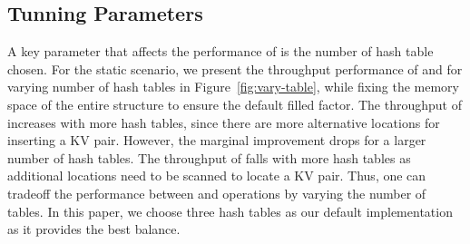 \subsection{Tunning Parameters}

A key parameter that affects the performance of \voter is the number of hash table chosen. For the static scenario, we present the throughput performance of  and  for varying number of hash tables in Figure~\ref{fig:vary-table}, while fixing the memory space of the entire structure to ensure the default filled factor. 
The throughput of  increases with more hash tables, since there are more alternative locations for inserting a KV pair. However, the marginal improvement drops for a larger number of hash tables. The throughput of  falls with more hash tables as additional locations need to be scanned to locate a KV pair. Thus, one can tradeoff the performance between  and  operations by varying the number of tables. In this paper, we choose three hash tables as our default implementation as it provides the best balance. 


